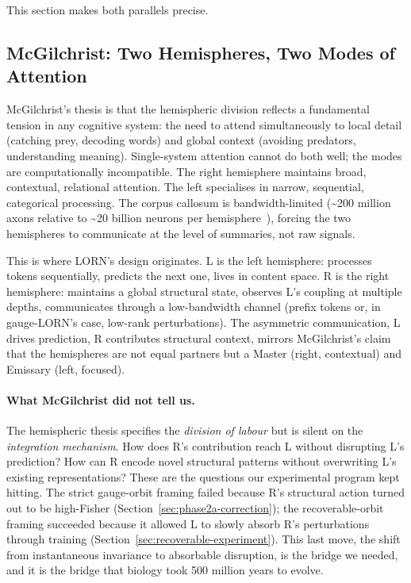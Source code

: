 \documentclass[11pt, a4paper]{article}
\theoremstyle{plain}
\theoremstyle{definition}
\theoremstyle{remark}
\begin{document}
This section makes both parallels precise.

\subsection{McGilchrist: Two Hemispheres, Two Modes of Attention}

McGilchrist's thesis is that the hemispheric division reflects a fundamental tension in any cognitive system: the need to attend simultaneously to local detail (catching prey, decoding words) and global context (avoiding predators, understanding meaning).
Single-system attention cannot do both well; the modes are computationally incompatible.
The right hemisphere maintains broad, contextual, relational attention.
The left specialises in narrow, sequential, categorical processing.
The corpus callosum is bandwidth-limited (\textasciitilde 200 million axons relative to \textasciitilde 20 billion neurons per hemisphere~\cite{ringo1994hemispheric}), forcing the two hemispheres to communicate at the level of summaries, not raw signals.

This is where LORN's design originates.
L is the left hemisphere: processes tokens sequentially, predicts the next one, lives in content space.
R is the right hemisphere: maintains a global structural state, observes L's coupling at multiple depths, communicates through a low-bandwidth channel (prefix tokens or, in gauge-LORN's case, low-rank perturbations).
The asymmetric communication, L drives prediction, R contributes structural context, mirrors McGilchrist's claim that the hemispheres are not equal partners but a Master (right, contextual) and Emissary (left, focused).

\paragraph{What McGilchrist did not tell us.}
The hemispheric thesis specifies the \emph{division of labour} but is silent on the \emph{integration mechanism}.
How does R's contribution reach L without disrupting L's prediction?
How can R encode novel structural patterns without overwriting L's existing representations?
These are the questions our experimental program kept hitting.
The strict gauge-orbit framing failed because R's structural action turned out to be high-Fisher (Section~\ref{sec:phase2a-correction}); the recoverable-orbit framing succeeded because it allowed L to slowly absorb R's perturbations through training (Section~\ref{sec:recoverable-experiment}).
This last move, the shift from instantaneous invariance to absorbable disruption, is the bridge we needed, and it is the bridge that biology took 500 million years to evolve.
\end{document}
